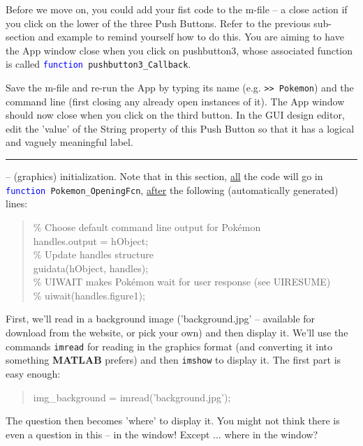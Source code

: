 \documentclass{tufte-book} %
\newenvironment{docspec}{\begin{quotation}\ttfamily\parskip0pt\parindent0pt\ignorespaces}{\end{quotation}}
\begin{document}
Before we move on, you could add your fist code to the \textsf{m-file} -- a close action if you click on the lower of the three \textsf{Push Buttons}. Refer to the previous sub-section and example to remind yourself how to do this. You are aiming to have the App window close when you click on \textsf{pushbutton3}, whose associated function is called \texttt{\textcolor{blue}{function} pushbutton3\_Callback}.

Save the \textsf{m-file} and re-run the App by typing its name (e.g. \texttt{>> Pokemon}) and the command line (first closing any already open instances of it). The App window should now close when you click on the third button. In the GUI design editor, edit the 'value' of the \textsf{String} property of this \textsf{Push Button} so that it has a logical and vaguely meaningful label. 

\vspace{1mm}
\noindent\rule{4cm}{0.5pt}
\vspace{-2mm}

 -- (graphics) initialization. Note that in this section, \uline{all} the code will go in \texttt{\textcolor{blue}{function} Pokemon\_OpeningFcn}, \uline{after} the following (automatically generated) lines:
\begin{docspec}
\textcolor[rgb]{0,0.501961,0}{\% Choose default command line output for Pok\'emon}
\\handles.output = hObject;
\textcolor[rgb]{0,0.501961,0}{\\\% Update handles structure}
\\guidata(hObject, handles);
\textcolor[rgb]{0,0.501961,0}{\\\% UIWAIT makes Pok\'emon wait for user response (see UIRESUME)
\\\% uiwait(handles.figure1);}
\end{docspec}

First, we'll read in a background image ('background.jpg' -- available for download from the  website, or pick your own) and then display it. We'll use the commands \texttt{imread} for reading in the graphics format (and converting it into something \textbf{MATLAB} prefers) and then \texttt{imshow} to display it. The first part is easy enough:
\begin{docspec}
img\_background = imread(\textcolor[rgb]{0.501961,0,1}{'background.jpg'});
\end{docspec}
The question then becomes 'where' to display it. You might not think there is even a question in this -- in the window! Except ... where in the window?
\end{document}
